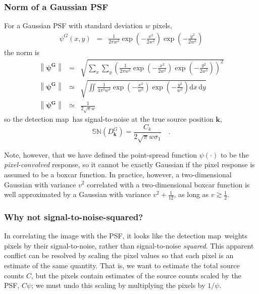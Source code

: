 \documentclass[letterpaper,preprint]{aastex}
\newcommand{\detmap}{detection map}
\newcommand{\psf}{\psi}
\newcommand{\snr}[1]{\mathbb{SN}(#1)}
\newcommand{\norm}[1]{\left\lVert #1 \right\rVert}
\newcommand{\psfw}{w}
\renewcommand{\vec}[1]{\boldsymbol{#1}}
\newcommand{\kvec}{\vec{k}}
\begin{document}
\subsubsection{Norm of a Gaussian PSF}
\label{app:gaussnorm}
For a Gaussian PSF with standard deviation $\psfw$ pixels,
\begin{eqnarray}\displaystyle
\psf^G(x,y) &=& \frac{1}{2 \pi \psfw^2} \exp{\left(-\frac{x^2}{2 \psfw^2}\right)} \exp{\left(-\frac{y^2}{2 \psfw^2}\right)}
\end{eqnarray}
the norm is%
\begin{eqnarray}
\norm{\bm{\psf^G}} &=& \sqrt{ \sum_{x} \sum_{y} \left(\frac{1}{2 \pi \psfw^2} \exp{\left(-\frac{x^2}{2 \psfw^2}\right)} \exp{\left(-\frac{y^2}{2 \psfw^2}\right)} \right)^2} \\
\norm{\bm{\psf^G}} &\simeq& \sqrt{\iint \frac{1}{4 \pi^2 \psfw^4} \exp{\left(-\frac{x^2}{\psfw^2}\right)} \exp{\left(-\frac{y^2}{\psfw^2}\right)} \mathrm{d}x \, \mathrm{d}y} \\
\norm{\bm{\psf^G}} &\simeq& \frac{1}{2 \sqrt{\pi} \psfw}
\end{eqnarray}
so the \detmap\ has signal-to-noise at the true source position $\kvec$,
\begin{equation}
\snr{D_{\kvec}^G} = \frac{C_k}{2 \sqrt{\pi} \psfw \sigma_1 } \quad .
\label{eqn:sndsinglegauss}
\end{equation}

Note, however, that we have defined the point-spread function
$\psi(\cdot)$ to be the \emph{pixel-convolved} response, so it cannot
be exactly Gaussian if the pixel response is assumed to be a boxcar
function.  In practice, however, a two-dimensional Gaussian with
variance $v^2$ correlated with a two-dimensional boxcar function is
well approximated by a Gaussian with variance $v^2 + \frac{1}{12}$, as
long as $v \gtrsim \frac{1}{2}$.





\subsubsection{Why not signal-to-noise-squared?}
In correlating the image with the PSF, it looks like the
\detmap\ weights pixels by their signal-to-noise, rather than
signal-to-noise \emph{squared}.  This apparent conflict can be
resolved by scaling the pixel values so that each pixel is an estimate
of the same quantity.  That is, we want to estimate the total source
counts $C$, but the pixels contain estimates of the source counts
scaled by the PSF, $C \psf$; we must undo this scaling by multiplying
the pixels by $1/\psf$.
\end{document}

